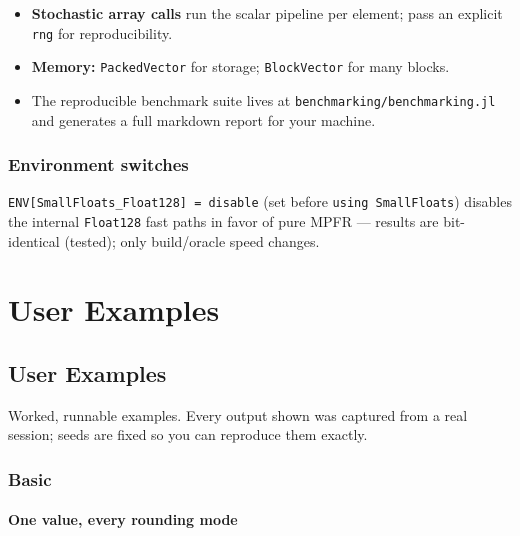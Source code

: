 \begin{itemize}
\item \textbf{Stochastic array calls} run the scalar pipeline per element; pass an explicit \texttt{rng} for reproducibility.


\item \textbf{Memory:} \texttt{PackedVector} for storage; \texttt{BlockVector} for many blocks.


\item The reproducible benchmark suite lives at \texttt{benchmarking/benchmarking.jl} and generates a full markdown report for your machine.

\end{itemize}


\section{Environment switches}



\label{2477270776453872570}{}


\texttt{ENV[{\textquotedbl}SmallFloats\_Float128{\textquotedbl}] = {\textquotedbl}disable{\textquotedbl}} (set before \texttt{using SmallFloats}) disables the internal \texttt{Float128} fast paths in favor of pure MPFR — results are bit-identical (tested); only build/oracle speed changes.



\part{User Examples}


\chapter{User Examples}



\label{7866567007412100191}{}


Worked, runnable examples. Every output shown was captured from a real session; seeds are fixed so you can reproduce them exactly.



\section{Basic}



\label{13551325986707881962}{}


\subsection{One value, every rounding mode}



